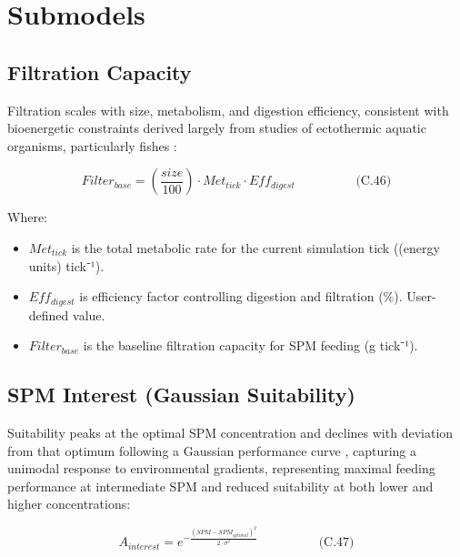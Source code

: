 \documentclass[
]{book}
\providecommand{\tightlist}{%
  \setlength{\itemsep}{0pt}\setlength{\parskip}{0pt}}
\begin{document}
\section{Submodels}\label{submodels-4}

\subsection{Filtration Capacity}\label{filtration-capacity}

Filtration scales with size, metabolism, and digestion efficiency,
consistent with bioenergetic constraints derived largely from studies of
ectothermic aquatic organisms, particularly fishes
\citep{norin_metabolic_2018}:

\[
\begin{equation} Filter_{base} = \left(\frac{size}{100}\right) \cdot Met_{tick} \cdot Eff_{digest} \hspace{2cm} \text{(C.46)} \end{equation}
\]

Where:

\begin{itemize}
\tightlist
\item
  \(Met_{tick}\) is the total metabolic rate for the current simulation
  tick ((energy units) tick⁻¹).
\item
  \(Eff_{digest}\) is efficiency factor controlling digestion and
  filtration (\%). User-defined value.
\item
  \(Filter_{base}\) is the baseline filtration capacity for SPM feeding
  (g tick⁻¹).
\end{itemize}

\subsection{SPM Interest (Gaussian Suitability)}\label{spm-interest-gaussian-suitability}

Suitability peaks at the optimal SPM concentration and declines with
deviation from that optimum following a Gaussian performance curve
\citep{hirzel_habitat_2008}, capturing a unimodal response to environmental
gradients, representing maximal feeding performance at intermediate SPM
and reduced suitability at both lower and higher concentrations:

\[
\begin{equation} A_{interest} = e^{-\frac{(SPM - SPM_{optimal})^2}{2 \cdot \sigma^2}}  \hspace{2cm} \text{(C.47)} \end{equation}
\]
\end{document}
